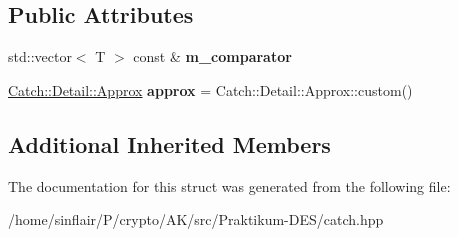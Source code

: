 \subsection*{Public Attributes}
\begin{DoxyCompactItemize}
\item 
\mbox{\label{structCatch_1_1Matchers_1_1Vector_1_1ApproxMatcher_a1394b5913d30bdd1147e1941fc41af56}} 
std\+::vector$<$ T $>$ const  \& {\bfseries m\+\_\+comparator}
\item 
\mbox{\label{structCatch_1_1Matchers_1_1Vector_1_1ApproxMatcher_a5515447af58adb5dc48a5d300b9ae162}} 
\hyperlink{classCatch_1_1Detail_1_1Approx}{Catch\+::\+Detail\+::\+Approx} {\bfseries approx} = Catch\+::\+Detail\+::\+Approx\+::custom()
\end{DoxyCompactItemize}
\subsection*{Additional Inherited Members}


The documentation for this struct was generated from the following file\+:\begin{DoxyCompactItemize}
\item 
/home/sinflair/\+P/crypto/\+A\+K/src/\+Praktikum-\/\+D\+E\+S/catch.\+hpp\end{DoxyCompactItemize}
